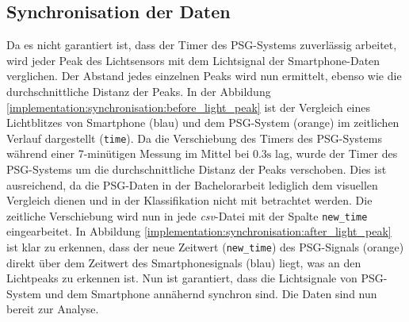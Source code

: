 \subsection{Synchronisation der Daten}
\label{ch:Implementierung:data_sync}
Da es nicht garantiert ist, dass der Timer des PSG-Systems zuverlässig arbeitet, wird jeder Peak des Lichtsensors mit dem Lichtsignal der Smartphone-Daten verglichen.
Der Abstand jedes einzelnen Peaks wird nun ermittelt, ebenso wie die durchschnittliche Distanz der Peaks.
In der Abbildung \ref{implementation:synchronisation:before_light_peak} ist der Vergleich eines Lichtblitzes von Smartphone (blau) und dem PSG-System (orange) im zeitlichen Verlauf dargestellt (\texttt{time}).
Da die Verschiebung des Timers des PSG-Systems während einer 7-minütigen Messung im Mittel bei $0.3\si{\s}$ lag, wurde der Timer des PSG-Systems um die durchschnittliche Distanz der Peaks verschoben.
Dies ist ausreichend, da die PSG-Daten in der Bachelorarbeit lediglich dem visuellen Vergleich dienen und in der Klassifikation nicht mit betrachtet werden. 
Die zeitliche Verschiebung wird nun in jede \textit{csv}-Datei mit der Spalte \texttt{new\_time} eingearbeitet.
In Abbildung \ref{implementation:synchronisation:after_light_peak} ist klar zu erkennen, dass der neue Zeitwert (\texttt{new\_time}) des PSG-Signals (orange) direkt über dem Zeitwert des Smartphonesignals (blau) liegt, was an den Lichtpeaks zu erkennen ist.
Nun ist garantiert, dass die Lichtsignale von PSG-System und dem Smartphone annähernd synchron sind. Die Daten sind nun bereit zur Analyse.


